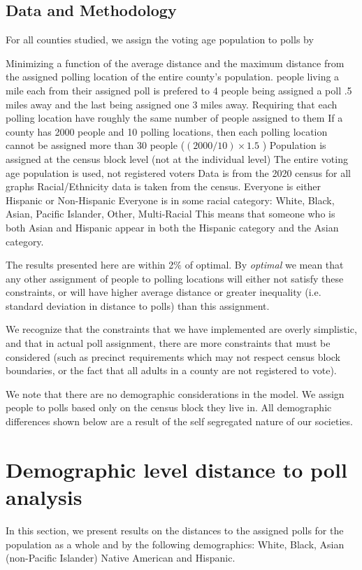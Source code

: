 \documentclass[11pt]{article}
\theoremstyle{remark}
\theoremstyle{definition}
\begin{document}
\subsection{Data and Methodology}
	For all counties studied, we assign the voting age population to polls by 
\begin{outline}
	\1 Minimizing a function of the average distance and the maximum distance from the assigned polling location of the entire county's population.
		 people living a mile each from their assigned poll is prefered to 4 people being assigned a poll .5 miles away and the last being assigned one 3 miles away.
	\1 Requiring that each polling location have roughly the same number of people assigned to them
		\2 If a county has 2000 people and 10 polling locations, then each polling location cannot be assigned more than 30 people ($(2000 / 10) \times 1.5$ )
	\1 Population is assigned at the census block level (not at the individual level)
		\2 The entire voting age population is used, not registered voters
		\2 Data is from the 2020 census for all graphs
		\2 Racial/Ethnicity data is taken from the census.
			\3 Everyone is either Hispanic or Non-Hispanic
			\3 Everyone is in some racial category: White, Black, Asian, Pacific Islander, Other, Multi-Racial
			\3 This means that someone who is both Asian and Hispanic appear in both the Hispanic category and the Asian category.
\end{outline}

The results presented here are within 2$\%$ of optimal. By \emph{optimal} we mean that any other assignment of people to polling locations will either not satisfy these constraints, or will have higher average distance or greater inequality (i.e. standard deviation in distance to polls) than this assignment. 

We recognize that the constraints that we have implemented are overly simplistic, and that in actual poll assignment, there are more constraints that must be considered (such as precinct requirements which may not respect census block boundaries, or the fact that all adults in a county are not registered to vote).

We note that there are no demographic considerations in the model. We assign people to polls based only on the census block they live in. All demographic differences shown below are a result of the self segregated nature of our societies.


\section{Demographic level distance to poll analysis \label{sec:distances}}
In this section, we present results on the distances to the assigned polls for the population as a whole and by the following demographics: White, Black, Asian (non-Pacific Islander) Native American and Hispanic.
\end{document}
